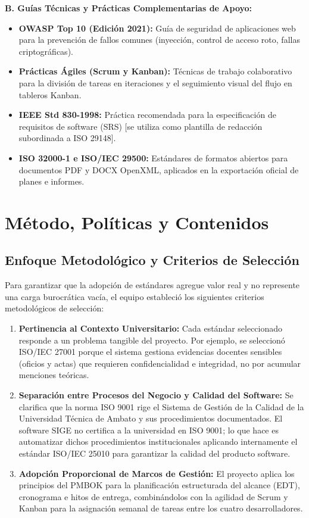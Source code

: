 \documentclass[12pt,a4paper]{article}
\begin{document}
\textbf{B. Guías Técnicas y Prácticas Complementarias de Apoyo:}
\begin{itemize}[leftmargin=1.5em, itemsep=2pt]
    \item \textbf{OWASP Top 10 (Edición 2021):} Guía de seguridad de aplicaciones web para la prevención de fallos comunes (inyección, control de acceso roto, fallas criptográficas).
    \item \textbf{Prácticas Ágiles (Scrum y Kanban):} Técnicas de trabajo colaborativo para la división de tareas en iteraciones y el seguimiento visual del flujo en tableros Kanban.
    \item \textbf{IEEE Std 830-1998:} Práctica recomendada para la especificación de requisitos de software (SRS) [se utiliza como plantilla de redacción subordinada a ISO 29148].
    \item \textbf{ISO 32000-1 e ISO/IEC 29500:} Estándares de formatos abiertos para documentos PDF y DOCX OpenXML, aplicados en la exportación oficial de planes e informes.
\end{itemize}

\section{Método, Políticas y Contenidos}

\subsection{Enfoque Metodológico y Criterios de Selección}
Para garantizar que la adopción de estándares agregue valor real y no represente una carga burocrática vacía, el equipo estableció los siguientes criterios metodológicos de selección:

\begin{enumerate}[leftmargin=1.5em, itemsep=2pt]
    \item \textbf{Pertinencia al Contexto Universitario:} Cada estándar seleccionado responde a un problema tangible del proyecto. Por ejemplo, se seleccionó ISO/IEC 27001 porque el sistema gestiona evidencias docentes sensibles (oficios y actas) que requieren confidencialidad e integridad, no por acumular menciones teóricas.
    \item \textbf{Separación entre Procesos del Negocio y Calidad del Software:} Se clarifica que la norma ISO 9001 rige el Sistema de Gestión de la Calidad de la Universidad Técnica de Ambato y sus procedimientos documentados. El software SIGE no certifica a la universidad en ISO 9001; lo que hace es automatizar dichos procedimientos institucionales aplicando internamente el estándar ISO/IEC 25010 para garantizar la calidad del producto software.
    \item \textbf{Adopción Proporcional de Marcos de Gestión:} El proyecto aplica los principios del PMBOK para la planificación estructurada del alcance (EDT), cronograma e hitos de entrega, combinándolos con la agilidad de Scrum y Kanban para la asignación semanal de tareas entre los cuatro desarrolladores.
\end{enumerate}
\end{document}
